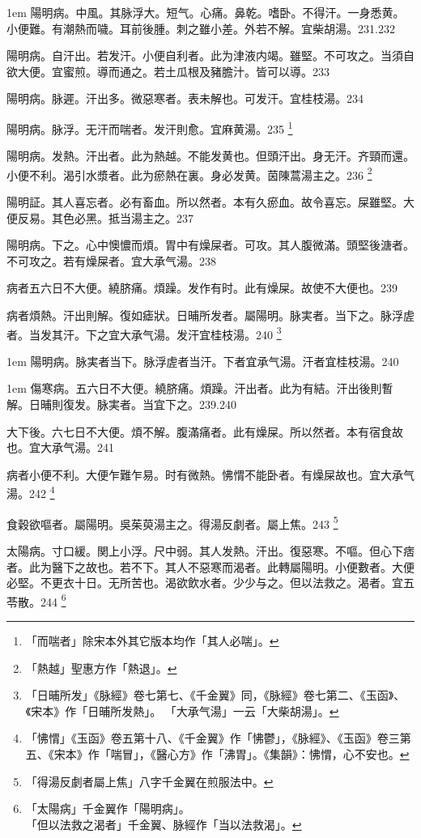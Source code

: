 \hangindent 1em
陽明病。中風。其脉浮大。短气。心痛。鼻乾。嗜卧。不得汗。一身悉黄。小便難。有潮熱而噦。耳前後腫。刺之雖小差。外若不解。宜柴胡湯。{\gaoben}231.232

陽明病。自汗出。若发汗。小便自利者。此为{\khaaitp 津液}内竭。雖堅。不可攻之。当須自欲大便。宜蜜煎。導而通之。若土瓜根及豬膽汁。皆可以導。233

陽明病。脉遲。汗出多。微惡寒者。表未解也。可发汗。宜桂枝湯。234

陽明病。脉浮。无汗而喘者。发汗則愈。宜麻黄湯。235
	\footnote{「而喘者」除宋本外其它版本均作「其人必喘」。}

陽明病。发熱。汗出者。此为熱越。不能发黄也。但頭汗出。身无汗。齐頸而還。小便不利。渴引水漿者。此为瘀熱在裏。身必发黄。茵陳{\khaaitp 蒿}湯主之。236
	\footnote{「熱越」聖惠方作「熱退」。}

陽明証。其人喜忘者。必有畜血。所以然者。本有久瘀血。故令喜忘。屎雖堅。大便反易。其色必黑。抵当湯主之。237

陽明病。下之。心中懊憹而煩。胃中有燥屎者。可攻。其人腹微滿。頭堅後溏者。不可攻之。若有燥屎者。宜{\khaaitp 大}承气湯。238

病者五六日不大便。繞脐痛。煩躁。发作有时。此有燥屎。故使不大便也。239

病者煩熱。汗出則解。復如瘧狀。日晡所发者。屬陽明。脉実者。当下之。脉浮虗者。当发其汗。下之宜{\khaaitp 大}承气湯。发汗宜桂枝湯。240
	\footnote{
		「日晡所发」《脉經》卷七第七、《千金翼》同，《脉經》卷七第二、《玉函》、《宋本》作「日晡所发熱」。
		「大承气湯」一云「大柴胡湯」。
	}

\hangindent 1em
陽明病。脉実者当下。脉浮虗者当汗。下者宜承气湯。汗者宜桂枝湯。{\gaoben}240

\hangindent 1em
傷寒病。五六日不大便。繞脐痛。煩躁。汗出者。此为有結。汗出後則暫解。日晡則復发。脉実者。当宜下之。{\gaoben}239.240

大下後。六七日不大便。煩不解。腹滿痛者。此有燥屎。所以然者。本有宿食故也。宜{\khaaitp 大}承气湯。241

病者小便不利。大便乍難乍易。时有微熱。怫㥜不能卧者。有燥屎故也。宜{\khaaitp 大}承气湯。242
	\footnote{
		「怫㥜」《玉函》卷五第十八、《千金翼》作「怫鬱」，《脉經》、《玉函》卷三第五、《宋本》作「喘冒」，《醫心方》作「沸胃」。《集韻》：怫㥜，心不安也。
	}

食穀欲嘔者。屬陽明。{\khaaitp 吳}茱萸湯主之。得湯反劇者。屬上焦。243
	\footnote{
		「得湯反劇者屬上焦」八字千金翼在煎服法中。
	}

太陽病。寸{\khaaitp 口}緩。関{\khaaitp 上小}浮。尺{\khaaitp 中}弱。其人发熱。汗出。復惡寒。不嘔。但心下痞者。此为醫下之故也。若不下。其人不惡寒而渴者。此轉屬陽明。小便數者。大便必堅。不更衣十日。无所苦也。{\khaaitp 渴}欲飲水者。少少与之。但以法救之。渴者。宜五苓散。244
	\footnote{
		「太陽病」千金翼作「陽明病」。\\
		「但以法救之渴者」千金翼、脉經作「当以法救渴」。
	}

